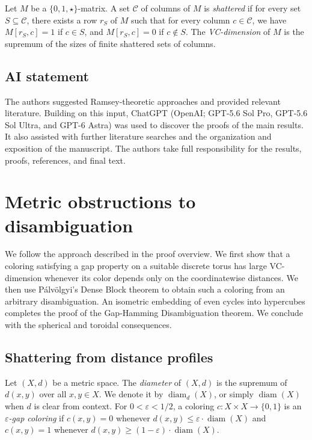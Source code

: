 \documentclass[11pt]{article}
\DeclareMathOperator{\diam}{diam}
\theoremstyle{remark}
\begin{document}
Let $M$ be a $\{0, 1, \star\}$-matrix.
A set $\mathcal{C}$ of columns of $M$ is \emph{shattered} if for every set $S \subseteq \mathcal{C}$, there exists a row $r_S$ of $M$ such that for every column $c \in \mathcal{C}$, we have $M[r_S, c] = 1$ if $c \in S$, and $M[r_S, c] = 0$ if $c \notin S$.
The \emph{VC-dimension} of $M$ is the supremum of the sizes of finite shattered sets of columns.

\subsection*{AI statement}
The authors suggested Ramsey-theoretic approaches and provided relevant literature.
Building on this input, ChatGPT (OpenAI; GPT-5.6 Sol Pro, GPT-5.6 Sol Ultra, and GPT-6 Astra) was used to discover the proofs of the main results.
It also assisted with further literature searches and the organization and exposition of the manuscript.
The authors take full responsibility for the results, proofs, references, and final text.

\section{Metric obstructions to disambiguation}

We follow the approach described in the proof overview.
We first show that a coloring satisfying a gap property on a suitable discrete torus has large VC-dimension whenever its color depends only on the coordinatewise distances. 
We then use Pálvölgyi’s Dense Block theorem to obtain such a coloring from an arbitrary disambiguation. 
An isometric embedding of even cycles into hypercubes completes the proof of the Gap-Hamming Disambiguation theorem. 
We conclude with the spherical and toroidal consequences.

\subsection{Shattering from distance profiles}

Let $(X, d)$ be a metric space. 
The \emph{diameter} of $(X, d)$ is the supremum of $d(x, y)$ over all $x, y \in X$. We denote it by $\diam_d(X)$, or simply $\diam(X)$ when $d$ is clear from context.
For $0 < \varepsilon < 1/2$, a coloring $c : X \times X \to \{0, 1\}$ is an \emph{$\varepsilon$-gap coloring} if $c(x, y) = 0$ whenever $d(x, y) \leq \varepsilon \cdot \diam(X)$ and $c(x, y) = 1$ whenever $d(x, y) \geq (1-\varepsilon) \cdot \diam(X)$.
\end{document}
